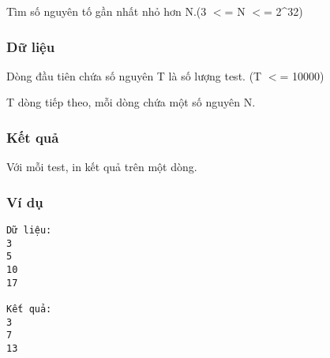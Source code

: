 



   Tìm số nguyên tố gần nhất nhỏ hơn N.(3 $<$= N $<$= 2\textasciicircum32)  

\subsubsection{   Dữ liệu  }

   Dòng đầu tiên chứa số nguyên T là số lượng test. (T $<$= 10000)  

   T dòng tiếp theo, mỗi dòng chứa một số nguyên N.  

\subsubsection{   Kết quả  }

   Với mỗi test, in kết quả trên một dòng.  

\subsubsection{   Ví dụ  }
\begin{verbatim}
Dữ liệu:
3
5 
10
17

Kết quả:
3
7
13
\end{verbatim}